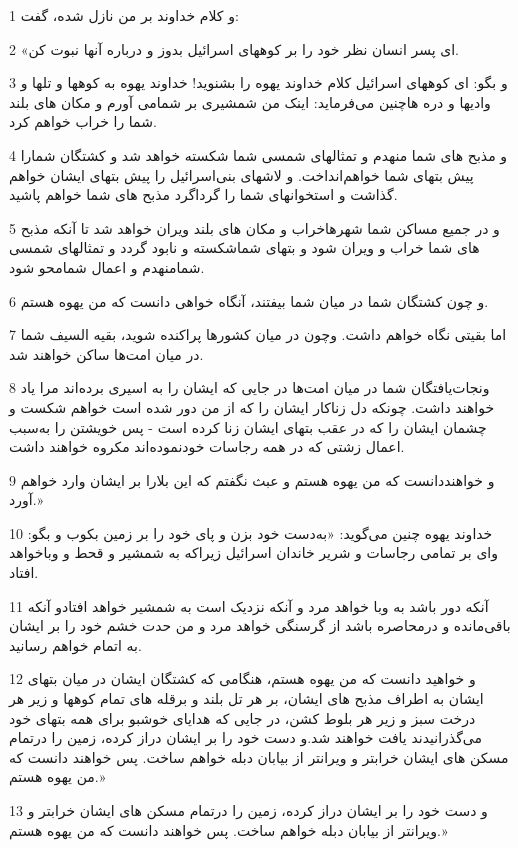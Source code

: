 \par 1 و کلام خداوند بر من نازل شده، گفت:
\par 2 «ای پسر انسان نظر خود را بر کوههای اسرائیل بدوز و درباره آنها نبوت کن.
\par 3 و بگو: ای کوههای اسرائیل کلام خداوند یهوه را بشنوید! خداوند یهوه به کوهها و تلها و وادیها و دره هاچنین می‌فرماید: اینک من شمشیری بر شمامی آورم و مکان های بلند شما را خراب خواهم کرد.
\par 4 و مذبح های شما منهدم و تمثالهای شمسی شما شکسته خواهد شد و کشتگان شمارا پیش بتهای شما خواهم‌انداخت. و لاشهای بنی‌اسرائیل را پیش بتهای ایشان خواهم گذاشت و استخوانهای شما را گرداگرد مذبح های شما خواهم پاشید.
\par 5 و در جمیع مساکن شما شهرهاخراب و مکان های بلند ویران خواهد شد تا آنکه مذبح های شما خراب و ویران شود و بتهای شماشکسته و نابود گردد و تمثالهای شمسی شمامنهدم و اعمال شمامحو شود.
\par 6 و چون کشتگان شما در میان شما بیفتند، آنگاه خواهی دانست که من یهوه هستم.
\par 7 اما بقیتی نگاه خواهم داشت. وچون در میان کشورها پراکنده شوید، بقیه السیف شما در میان امت‌ها ساکن خواهند شد.
\par 8 ونجات‌یافتگان شما در میان امت‌ها در جایی که ایشان را به اسیری برده‌اند مرا یاد خواهند داشت. چونکه دل زناکار ایشان را که از من دور شده است خواهم شکست و چشمان ایشان را که در عقب بتهای ایشان زنا کرده است - پس خویشتن را به‌سبب اعمال زشتی که در همه رجاسات خودنموده‌اند مکروه خواهند داشت.
\par 9 و خواهنددانست که من یهوه هستم و عبث نگفتم که این بلارا بر ایشان وارد خواهم آورد.»
\par 10 خداوند یهوه چنین می‌گوید: «به‌دست خود بزن و پای خود را بر زمین بکوب و بگو: وای بر تمامی رجاسات و شریر خاندان اسرائیل زیراکه به شمشیر و قحط و وباخواهد افتاد.
\par 11 آنکه دور باشد به وبا خواهد مرد و آنکه نزدیک است به شمشیر خواهد افتادو آنکه باقی‌مانده و درمحاصره باشد از گرسنگی خواهد مرد و من حدت خشم خود را بر ایشان به اتمام خواهم رسانید.
\par 12 و خواهید دانست که من یهوه هستم، هنگامی که کشتگان ایشان در میان بتهای ایشان به اطراف مذبح های ایشان، بر هر تل بلند و برقله های تمام کوهها و زیر هر درخت سبز و زیر هر بلوط کشن، در جایی که هدایای خوشبو برای همه بتهای خود می‌گذرانیدند یافت خواهند شد.و دست خود را بر ایشان دراز کرده، زمین را درتمام مسکن های ایشان خرابتر و ویرانتر از بیابان دبله خواهم ساخت. پس خواهند دانست که من یهوه هستم.»
\par 13 و دست خود را بر ایشان دراز کرده، زمین را درتمام مسکن های ایشان خرابتر و ویرانتر از بیابان دبله خواهم ساخت. پس خواهند دانست که من یهوه هستم.»

